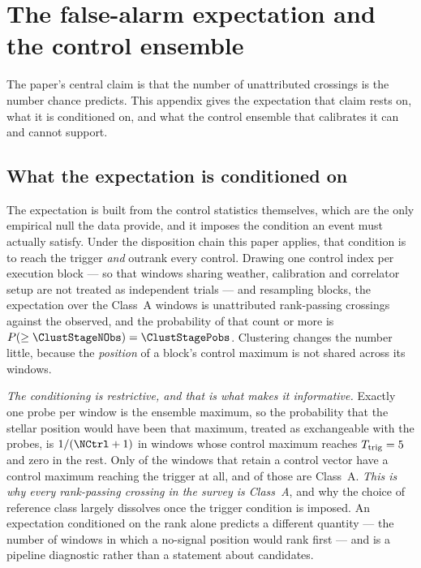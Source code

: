 \section{The false-alarm expectation and the control ensemble}
\label{app:falsealarm}

The paper's central claim is that the number of unattributed crossings is the
number chance predicts. This appendix gives the expectation that claim rests
on, what it is conditioned on, and what the control ensemble that calibrates
it can and cannot support.

\subsection{What the expectation is conditioned on}

The expectation is built from the control statistics themselves, which are
the only empirical null the data provide, and it imposes the condition an
event must actually satisfy. Under the disposition chain this paper applies,
that condition is to reach the trigger \emph{and} outrank every control.
Drawing one control index per execution block --- so that windows sharing
weather, calibration and correlator setup are not treated as independent
trials --- and resampling blocks, the expectation over the \NWinA{} Class~A
windows is \ClustStageMean{} unattributed rank-passing crossings against the
\ClustStageNObs{} observed, and the probability of that count or more is
$P(\geq\ClustStageNObs)=\ClustStagePobs$. Clustering changes the number
little, because the \emph{position} of a block's control maximum is not
shared across its windows.

\emph{The conditioning is restrictive, and that is what makes it
informative.} Exactly one probe per window is the ensemble maximum, so the
probability that the stellar position would have been that maximum, treated
as exchangeable with the probes, is $1/(\NCtrl+1)$ in windows whose control
maximum reaches $T_{\rm trig}=5$ and zero in the rest. Only
\StageNullEligible{} of the \StageNullAllWin{} windows that retain a control
vector have a control maximum reaching the trigger at all, and
\StageNullEligibleA{} of those are Class~A. \emph{This is why every
rank-passing crossing in the survey is Class~A}, and why the choice of
reference class largely dissolves once the trigger condition is imposed. An
expectation conditioned on the rank alone predicts a different quantity ---
the number of windows in which a no-signal position would rank first --- and
is a pipeline diagnostic rather than a statement about candidates.

